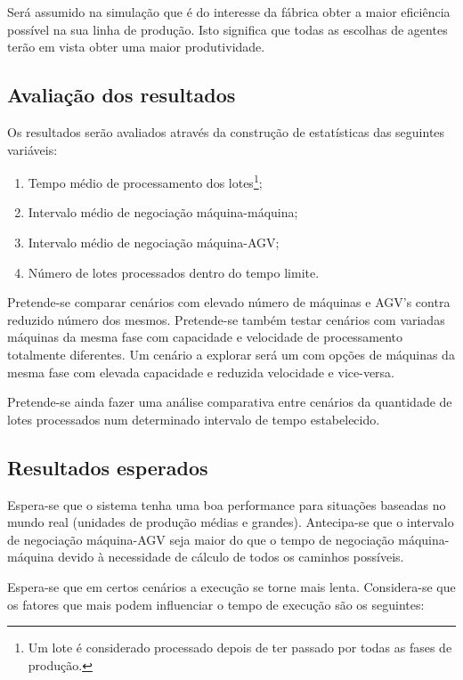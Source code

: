 \begin{titlepage}
Será assumido na simulação que é do interesse da fábrica obter a maior eficiência possível na sua linha de produção. Isto significa que todas as escolhas de agentes terão em vista obter uma maior produtividade.

\subsection{Avaliação dos resultados} \label{ssec:evaluation}
\justify\normalsize
Os resultados serão avaliados através da construção de estatísticas das seguintes variáveis:

\begin{enumerate}
\item Tempo médio de processamento dos lotes\footnote{Um lote é considerado processado depois de ter passado por todas as fases de produção.};
\item Intervalo médio de negociação máquina-máquina;
\item Intervalo médio de negociação máquina-AGV;
\item Número de lotes processados dentro do tempo limite.
\end{enumerate}

Pretende-se comparar cenários com elevado número de máquinas e AGV's contra reduzido número dos mesmos. Pretende-se também testar cenários com variadas máquinas da mesma fase com capacidade e velocidade de processamento totalmente diferentes. Um cenário a explorar será um com opções de máquinas da mesma fase com elevada capacidade e reduzida velocidade e vice-versa.

Pretende-se ainda fazer uma análise comparativa entre cenários da quantidade de lotes processados num determinado intervalo de tempo estabelecido.

\subsection{Resultados esperados}
\justify\normalsize
Espera-se que o sistema tenha uma boa performance para situações baseadas no mundo real (unidades de produção médias e grandes). Antecipa-se que o intervalo de negociação máquina-AGV seja maior do que o tempo de negociação máquina-máquina devido à necessidade de cálculo de todos os caminhos possíveis.\newline 

Espera-se que em certos cenários a execução se torne mais lenta. Considera-se que os fatores que mais podem influenciar o tempo de execução são os seguintes:


\end{titlepage}
